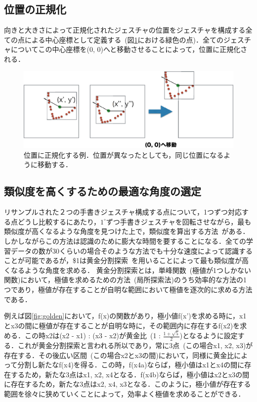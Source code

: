 \subsection{位置の正規化}
向きと大きさによって正規化されたジェスチャの位置をジェスチャを構成する全ての点による中心座標として定義する~(図\ref{fig:position}における緑色の点)．全てのジェスチャについてこの中心座標を(0, 0)へと移動させることによって，位置に正規化される．

\begin{figure} [!h]
\centering
\includegraphics [width=0.8\columnwidth]{img/position.eps}
\caption{位置に正規化する例．位置が異なったとしても，同じ位置になるように移動する．}
\label{fig:position}
\end{figure}

\subsection{類似度を高くするための最適な角度の選定}
リサンプルされた２つの手書きジェスチャ構成する点について，1つずつ対応する点どうし比較するにあたり，$1^\circ$ずつ手書きジェスチャを回転させながら，最も類似度が高くなるような角度を見つけた上で，類似度を算出する方法~\cite{Kara:2005:ITS:1652319.1652712}がある．しかしながらこの方法は認識のために膨大な時間を要することになる．全ての学習データの数が30くらいの場合そのような方法でも十分な速度によって認識することが可能であるが，\$1は黄金分割探索~\cite{Press:1992:NRC:148286}を用いることによって最も類似度が高くなるような角度を求める．
黄金分割探索とは，単峰関数~(極値が1つしかない関数)において，極値を求めるための方法~(局所探索法)のうち効率的な方法の1つであり，極値が存在することが自明な範囲において極値を逐次的に求める方法である．

例えば図\ref{fig:golden}において，f(x)の関数があり，極小値f(x')を求める時に，x1とx3の間に極値が存在することが自明な時に，その範囲内に存在するf(x2)を求める．この時x2は(x2 - x1) : (x3 - x2)が黄金比~(1 : $\frac{1+\sqrt{5}}{2}$)となるように設定する．これが黄金分割探索と言われる所以であり，常に3点~(この場合x1, x2, x3)が存在する．その後広い区間~(この場合x2とx3の間)において，同様に黄金比によって分割し新たなf(x4)を得る．この時，f(x4a)ならば，極小値はx1とx4の間に存在するため，新たな3点はx1, x2, x4となる．f(x4b)ならば，極小値はx2とx3の間に存在するため，新たな3点はx2, x4, x3となる．このように，極小値が存在する範囲を徐々に狭めていくことによって，効率よく極値を求めることができる．

